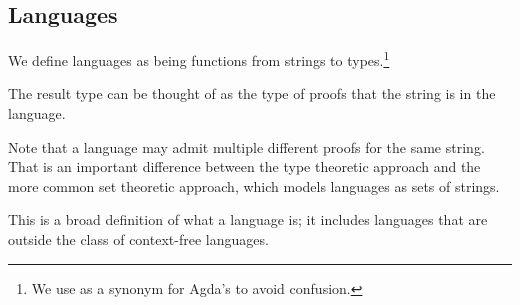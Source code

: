 \subsection{Languages}

We define languages as being functions from strings to types.\footnote{We use  as a synonym for Agda's  to avoid confusion.}
\begin{code}[hide]%
\>[0]\AgdaSpace{}%
\AgdaSymbol{:}\AgdaSpace{}%
\<%
\end{code}
\begin{code}%
\>[0]\AgdaSpace{}%
\AgdaSymbol{=}\AgdaSpace{}%
\AgdaSpace{}%
\AgdaSpace{}%
\<%
\end{code}
The result type can be thought of as the type of proofs that the string is in the language.
\begin{remark}
Note that a language may admit multiple different proofs for the same string. That is an important difference between the type theoretic approach and the more common set theoretic approach, which models languages as sets of strings.
\end{remark}
This is a broad definition of what a language is; it includes languages that are outside the class of context-free languages. 
